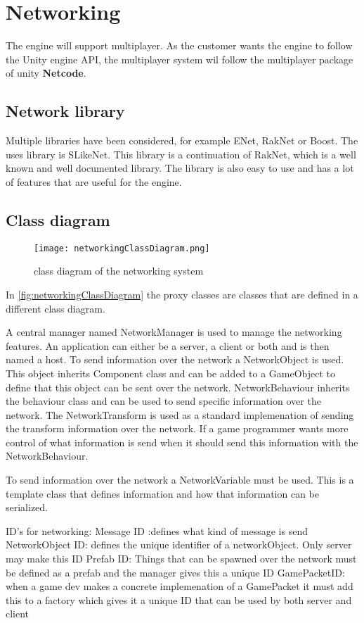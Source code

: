 \section{Networking}
\label{sec:networking}
The engine will support multiplayer.
As the customer wants the engine to follow the Unity engine API, the multiplayer system wil follow the multiplayer package of unity \textbf{Netcode}.

\subsection{Network library}
Multiple libraries have been considered, for example ENet, RakNet or Boost.
The uses library is SLikeNet. This library is a continuation of RakNet, which is a well known and well documented library.
The library is also easy to use and has a lot of features that are useful for the engine.

\subsection{Class diagram}

\begin{figure}[H]
    \centering
    \texttt{[image: networkingClassDiagram.png]}
    \caption{class diagram of the networking system}
    \label{fig:networkingClassDiagram}
\end{figure}
In \autoref{fig:networkingClassDiagram} the proxy classes are classes that are defined in a different class diagram.

A central manager named NetworkManager is used to manage the networking features.
An application can either be a server, a client or both and is then named a host.
To send information over the network a NetworkObject is used.
This object inherits Component class and can be added to a GameObject to define that this object can be sent over the network.
NetworkBehaviour inherits the behaviour class and can be used to send specific information over the network.
The NetworkTransform is used as a standard implemenation of sending the transform information over the network.
If a game programmer wants more control of what information is send when it should send this information with the NetworkBehaviour.

To send information over the network a NetworkVariable must be used.
This is a template class that defines information and how that information can be serialized.

ID's for networking:
Message ID :defines what kind of message is send
NetworkObject ID: defines the unique identifier of a networkObject. Only server may make this ID
Prefab ID: Things that can be spawned over the network must be defined as a prefab and the manager gives this a unique ID
GamePacketID: when a game dev makes a concrete implemenation of a GamePacket it must add this to a factory which gives it a unique ID that can be used by both server and client 

